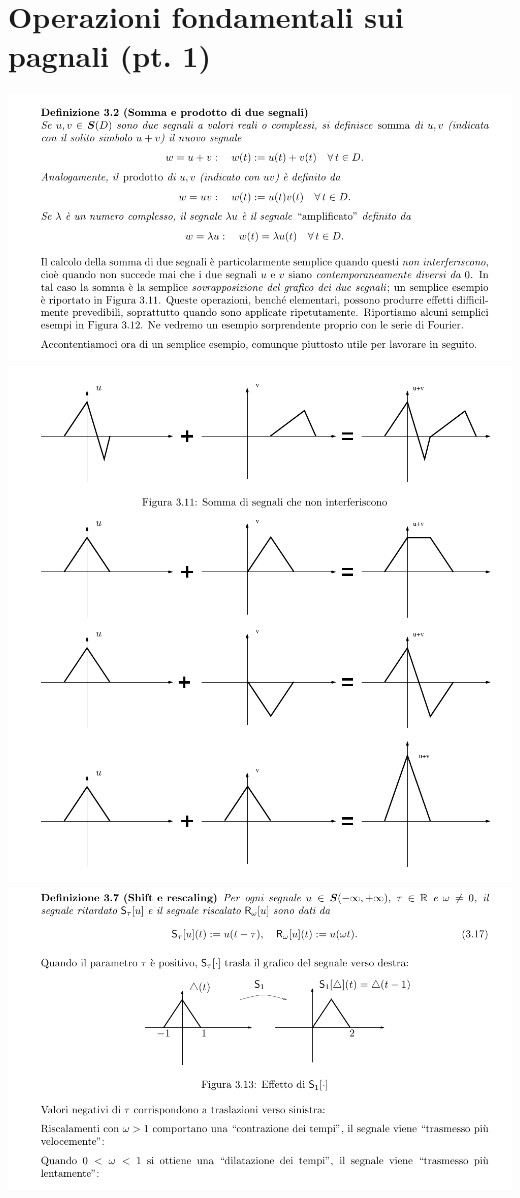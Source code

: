 \documentclass[a4paper, 10pt]{report}
\begin{document}
\section*{Operazioni fondamentali sui pagnali (pt. 1)}
\begin{center}
\includegraphics[scale=1]{part1.pdf}
\includegraphics[scale=1]{part2.pdf}
\includegraphics[scale=1]{part3.pdf}

\end{center}
\end{document}
